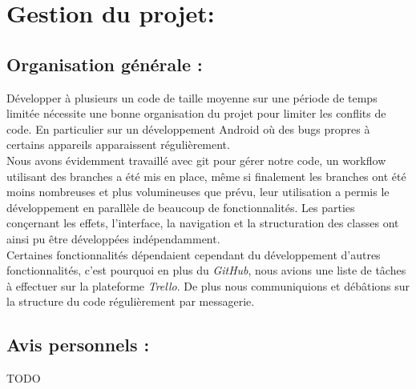 \section{Gestion du projet:}

\subsection{Organisation générale :}
Développer à plusieurs un code de taille moyenne sur une période de temps limitée nécessite une bonne organisation du projet pour limiter les conflits de code. En particulier sur un développement Android où des bugs propres à certains appareils apparaissent régulièrement.
\\

Nous avons évidemment travaillé avec git pour gérer notre code, un workflow utilisant des branches a été mis en place, même si finalement les branches ont été moins nombreuses et plus volumineuses que prévu, leur utilisation a permis le développement en parallèle de beaucoup de fonctionnalités. Les parties conçernant les effets, l'interface, la navigation et la structuration des classes ont ainsi pu être développées indépendamment.
\\
Certaines fonctionnalités dépendaient cependant du développement d'autres fonctionnalités, c'est pourquoi en plus du \textit{GitHub}, nous avions une liste de tâches à effectuer sur la plateforme \textit{Trello}. De plus nous communiquions et débâtions sur la structure du code régulièrement par messagerie.


\subsection{Avis personnels :}
TODO